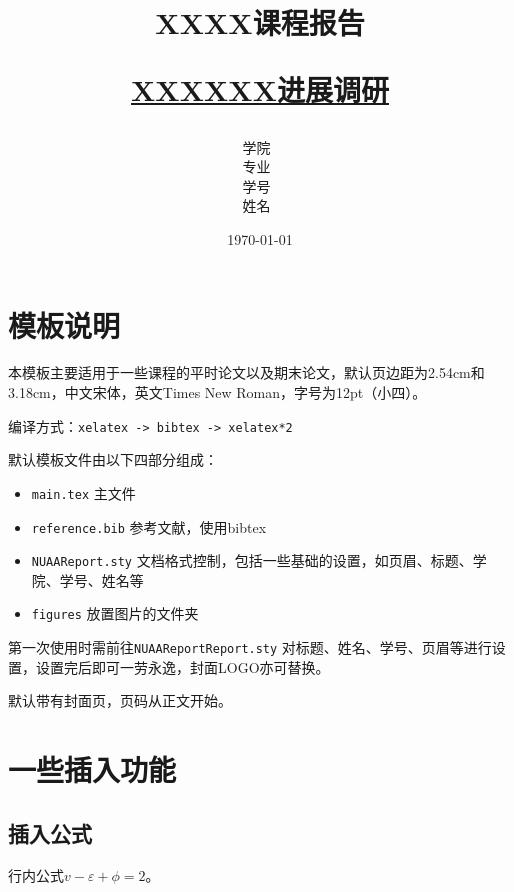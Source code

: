 \documentclass[12pt,hyperref,a4paper,UTF8]{ctexart}
\title{ 
        \vspace{1cm}
        \heiti \Huge \textbf{{XXXX课程报告}} \par
        \vspace{1cm} 
        \heiti \Large {\underline{XXXXXX进展调研}}    
        \vspace{3cm}
    }
\author{
        \vspace{0.5cm}
        \kaishu\Large 学院\ \dlmu[9cm]{计算机学院} \\ %
        \vspace{0.5cm}
        \kaishu\Large 专业\ \dlmu[9cm]{计算机科学与技术} \\ %
        \vspace{0.5cm}
        \kaishu\Large 学号\ \dlmu[9cm]{2025XXXXXX} \qquad  \\ %
        \vspace{0.5cm}
        \kaishu\Large 姓名\ \dlmu[9cm]{XXX} \qquad \\ %
    }
\date{\today} %
\begin{document}
\cover

%
%

\thispagestyle{empty} %


\newpage
\setcounter{page}{1} %


\section{模板说明}
本模板主要适用于一些课程的平时论文以及期末论文，默认页边距为2.54cm和3.18cm，中文宋体，英文Times New Roman，字号为12pt（小四）。

编译方式：\verb|xelatex -> bibtex -> xelatex*2|


默认模板文件由以下四部分组成：
\begin{itemize}
    \item \texttt{main.tex} 主文件
    \item \texttt{reference.bib} 参考文献，使用bibtex
    \item \texttt{NUAAReport.sty} 文档格式控制，包括一些基础的设置，如页眉、标题、学院、学号、姓名等
    \item \texttt{figures} 放置图片的文件夹
\end{itemize}

第一次使用时需前往\texttt{NUAAReportReport.sty} 对标题、姓名、学号、页眉等进行设置，设置完后即可一劳永逸，封面LOGO亦可替换。

默认带有封面页，页码从正文开始。

\section{一些插入功能}
\subsection{插入公式}
行内公式$v-\varepsilon+\phi=2$。
\end{document}
